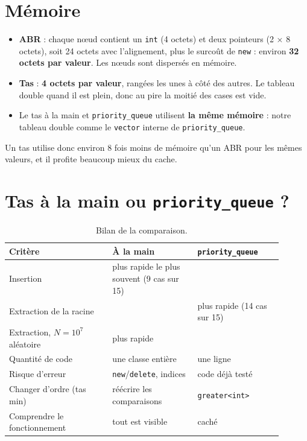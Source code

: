 \documentclass[12pt,a4paper]{report}
\begin{document}
\section{Mémoire}
\begin{itemize}
  \item \textbf{ABR} : chaque nœud contient un \texttt{int} (4 octets) et deux pointeurs (2 × 8 octets), soit 24 octets avec l'alignement, plus le surcoût de \texttt{new} : environ \textbf{32 octets par valeur}. Les nœuds sont dispersés en mémoire.
  \item \textbf{Tas} : \textbf{4 octets par valeur}, rangées les unes à côté des autres. Le tableau double quand il est plein, donc au pire la moitié des cases est vide.
  \item Le tas à la main et \texttt{priority\_queue} utilisent \textbf{la même mémoire} : notre tableau double comme le \texttt{vector} interne de \texttt{priority\_queue}.
\end{itemize}
Un tas utilise donc environ 8 fois moins de mémoire qu'un ABR pour les mêmes valeurs, et il profite beaucoup mieux du cache.

\section{Tas à la main ou \texttt{priority\_queue} ?}
\begin{table}[H]
\centering
\caption{Bilan de la comparaison.}
\begin{tabular}{p{0.34\linewidth}p{0.28\linewidth}p{0.28\linewidth}}
  \toprule
  Critère & À la main & \texttt{priority\_queue} \\
  \midrule
  Insertion & \cellcolor{ok} plus rapide le plus souvent (9 cas sur 15) & \\
  Extraction de la racine & & \cellcolor{ok} plus rapide (14 cas sur 15) \\
  Extraction, $N=10^7$ aléatoire & \cellcolor{ok} plus rapide & \\
  Quantité de code & une classe entière & \cellcolor{ok} une ligne \\
  Risque d'erreur & \texttt{new}/\texttt{delete}, indices & \cellcolor{ok} code déjà testé \\
  Changer d'ordre (tas min) & réécrire les comparaisons & \cellcolor{ok} \texttt{greater<int>} \\
  Comprendre le fonctionnement & \cellcolor{ok} tout est visible & caché \\
  \bottomrule
\end{tabular}
\end{table}
\end{document}
